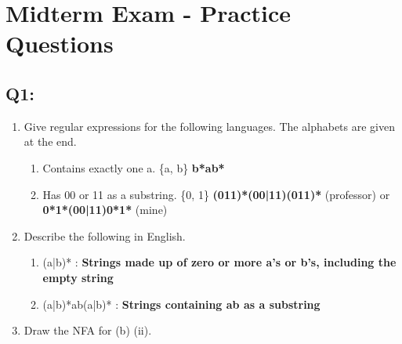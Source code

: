 \documentclass{report}
\begin{document}
\renewcommand\thechapter{E1}
\chapter{Midterm Exam - Practice Questions}
\section{Q1:}
\begin{enumerate}[label=(\alph*)]
  \item Give regular expressions for the following languages. The alphabets are given at the end.
  \begin{enumerate}[label=\roman*.]
    \item Contains exactly one a. \{a, b\} \hspace{1em} \textbf{b*ab*}
    
    \item Has 00 or 11 as a substring. \{0, 1\} \textbf{(011)*(00|11)(011)*} (professor) or \textbf{0*1*(00|11)0*1*} (mine)
  \end{enumerate}
  \item Describe the following in English.
  \begin{enumerate}[label=\roman*.]
    \item (a|b)* : \hspace{3.3em} \textbf{Strings made up of zero or more a's or b's, including the empty string}
    \item (a|b)*ab(a|b)* : \textbf{Strings containing ab as a substring}
  \end{enumerate}
  \item Draw the NFA for (b) (ii).
  

\end{enumerate}
\end{document}
